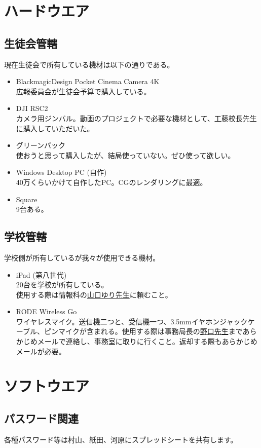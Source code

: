 \documentclass[dvipdfmx,jb5]{jarticle}
\newcommand{\mail}[2]{\href{mailto:#2}{#1}}
\begin{document}
\section{ハードウエア}
\subsection{生徒会管轄}
 現在生徒会で所有している機材は以下の通りである。
 \begin{itemize}
  \item BlackmagicDesign Pocket Cinema Camera 4K\\
  広報委員会が生徒会予算で購入している。
  \item DJI RSC2\\
  カメラ用ジンバル。動画のプロジェクトで必要な機材として、工藤校長先生に購入していただいた。
  \item グリーンバック\\
  使おうと思って購入したが、結局使っていない。ぜひ使って欲しい。
  \item Windows Desktop PC (自作)\\
 40万くらいかけて自作したPC。CGのレンダリングに最適。
  \item Square\\
  9台ある。
 \end{itemize}

 \subsection{学校管轄}
 学校側が所有しているが我々が使用できる機材。
 \begin{itemize}
  \item iPad (第八世代)\\
  20台を学校が所有している。\\
  使用する際は情報科の\mail{山口ゆり先生}{yuri.yamaguchi@seiko.ac.jp}に頼むこと。
  \item RODE Wireless Go\\
  ワイヤレスマイク。送信機二つと、受信機一つ、3.5mmイヤホンジャックケーブル、ピンマイクが含まれる。使用する際は事務局長の\mail{野口先生}{noguchi@seiko.ac.jp}まであらかじめメールで連絡し、事務室に取りに行くこと。返却する際もあらかじめメールが必要。
 \end{itemize}

 \section{ソフトウエア}
 \subsection{パスワード関連}
 各種パスワード等は村山、紙田、河原にスプレッドシートを共有します。
\end{document}
